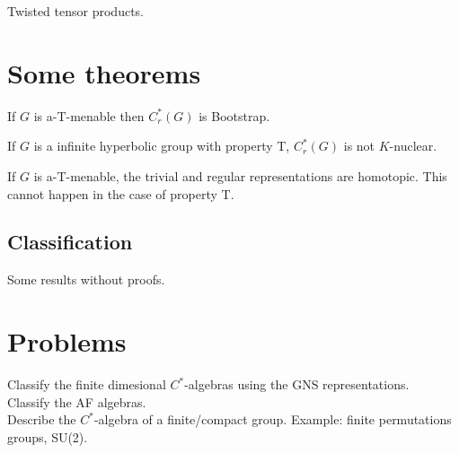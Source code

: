 Twisted tensor products.

\section{Some theorems}
\begin{thm}
[Tu] If $G$ is a-T-menable then $C^*_r(G)$ is Bootstrap.
\end{thm}

\begin{thm}
If $G$ is a infinite hyperbolic group with property T, $C^*_r(G)$ is not $K$-nuclear.
\end{thm}

If $G$ is a-T-menable, the trivial and regular representations are homotopic. This cannot happen in the case of property T.\\

\subsection{Classification}

Some results without proofs.

\section{Problems}

Classify the finite dimesional $C^*$-algebras using the GNS representations.\\

Classify the AF algebras.\\

Describe the $C^*$-algebra of a finite/compact group. Example: finite permutations groups, SU(2).